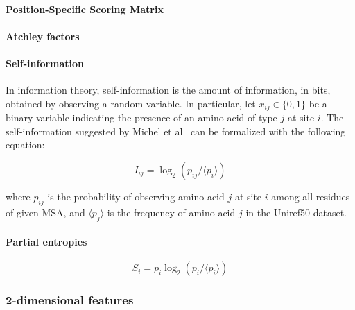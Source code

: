         \paragraph{Position-Specific Scoring Matrix}


        \paragraph{Atchley factors}


        \paragraph{Self-information}

            In information theory, self-information is the amount of information, in bits,
            obtained by observing a random variable. In particular, let $x_{ij} \in \{0, 1\}$ be
            a binary variable indicating the presence of an amino acid of type $j$ at site $i$.
            The self-information suggested by Michel et al~\cite{Michel383133} can be formalized
            with the following equation:

            \begin{equation}
                I_{ij} = \log_2 (p_{ij} / \langle p_i \rangle)
            \end{equation}

            where $p_{ij}$ is the probability of observing amino acid $j$ at site $i$ among all residues
            of given MSA, and $\langle p_j \rangle$ is the frequency of amino acid $j$
            in the Uniref50 dataset.

        \paragraph{Partial entropies}


            \begin{equation}
                S_i = p_i \log_2 (p_i / \langle p_i \rangle)
            \end{equation}

    \subsubsection{2-dimensional features}

